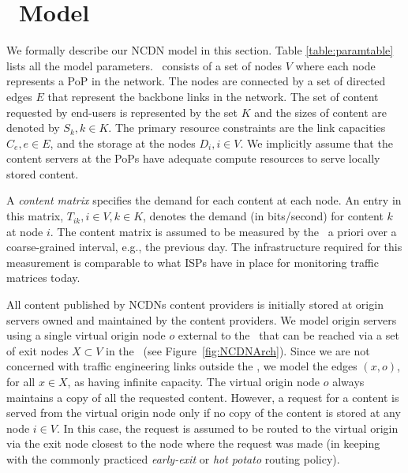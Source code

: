 \section{\ncp\ Model}
\label{sec:model}



We formally describe our NCDN model in this section. Table \ref{table:paramtable} lists all the model parameters. \Ancp\ consists of a set of nodes $V$ where each node represents a PoP in the network. The nodes are connected by a set of directed edges $E$ that represent the backbone links in the network. The set of content requested by end-users is represented by the set $K$ and the sizes of content are denoted by $S_k, k\in K$.  The primary resource constraints are the link capacities $C_e, e\in E$, and the storage at the nodes $D_i, i\in V$. We implicitly assume that the content servers at the PoPs have adequate compute resources to serve locally stored content. 



A {\em content matrix} specifies the demand for each content at each node. An entry in this matrix, $T_{ik}, i\in V, k\in K$, denotes the demand (in bits/second) for content $k$ at node $i$.  The content matrix is assumed to be measured by the \ncp\ a priori over a coarse-grained interval, e.g., the previous day. The infrastructure required for this measurement is comparable to what ISPs have in place for monitoring traffic matrices today.


All content published by NCDNs content providers is initially stored at origin servers owned and maintained by the content providers. We model origin servers using a single virtual origin node $o$ external to the \ncp\ that can be reached via a set of exit nodes $X \subset V$ in the \ncp\ (see Figure~\ref{fig:NCDNArch}). 
Since we are not concerned with traffic engineering links outside the \ncp, we model the edges $(x, o)$, for all $x \in X$, as having infinite capacity. The virtual origin node $o$  always maintains a copy of all the requested content. However, a request for a content is served from the virtual origin node only if no copy of the content is stored at any node $i \in V$. In this case, the request is assumed to be routed to the virtual origin  via the exit node closest to the node where the request was made (in keeping with the commonly practiced {\em early-exit} or {\em hot potato} routing policy).


